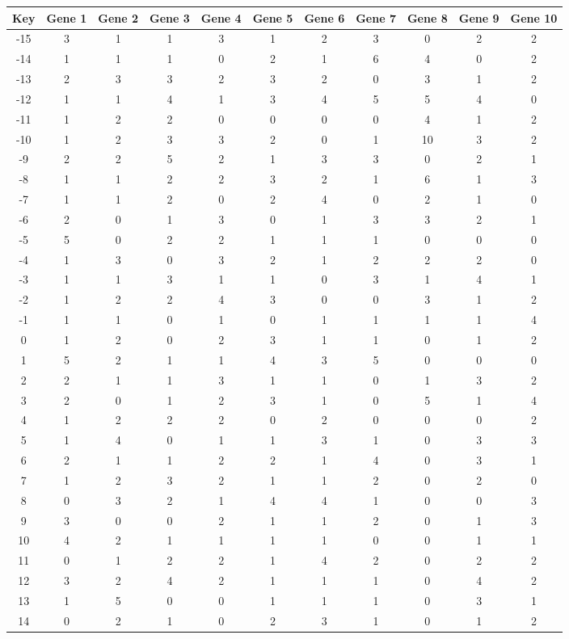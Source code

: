 \begin{tabular}{|c|c|c|c|c|c|c|c|c|c|c|}
\hline
Key & Gene 1 & Gene 2 & Gene 3 & Gene 4 & Gene 5 & Gene 6 & Gene 7 & Gene 8 & Gene 9 & Gene 10 \\
\hline
-15 & 3 & 1 & 1 & 3 & 1 & 2 & 3 & 0 & 2 & 2 \\
-14 & 1 & 1 & 1 & 0 & 2 & 1 & 6 & 4 & 0 & 2 \\
-13 & 2 & 3 & 3 & 2 & 3 & 2 & 0 & 3 & 1 & 2 \\
-12 & 1 & 1 & 4 & 1 & 3 & 4 & 5 & 5 & 4 & 0 \\
-11 & 1 & 2 & 2 & 0 & 0 & 0 & 0 & 4 & 1 & 2 \\
-10 & 1 & 2 & 3 & 3 & 2 & 0 & 1 & 10 & 3 & 2 \\
-9 & 2 & 2 & 5 & 2 & 1 & 3 & 3 & 0 & 2 & 1 \\
-8 & 1 & 1 & 2 & 2 & 3 & 2 & 1 & 6 & 1 & 3 \\
-7 & 1 & 1 & 2 & 0 & 2 & 4 & 0 & 2 & 1 & 0 \\
-6 & 2 & 0 & 1 & 3 & 0 & 1 & 3 & 3 & 2 & 1 \\
-5 & 5 & 0 & 2 & 2 & 1 & 1 & 1 & 0 & 0 & 0 \\
-4 & 1 & 3 & 0 & 3 & 2 & 1 & 2 & 2 & 2 & 0 \\
-3 & 1 & 1 & 3 & 1 & 1 & 0 & 3 & 1 & 4 & 1 \\
-2 & 1 & 2 & 2 & 4 & 3 & 0 & 0 & 3 & 1 & 2 \\
-1 & 1 & 1 & 0 & 1 & 0 & 1 & 1 & 1 & 1 & 4 \\
0 & 1 & 2 & 0 & 2 & 3 & 1 & 1 & 0 & 1 & 2 \\
1 & 5 & 2 & 1 & 1 & 4 & 3 & 5 & 0 & 0 & 0 \\
2 & 2 & 1 & 1 & 3 & 1 & 1 & 0 & 1 & 3 & 2 \\
3 & 2 & 0 & 1 & 2 & 3 & 1 & 0 & 5 & 1 & 4 \\
4 & 1 & 2 & 2 & 2 & 0 & 2 & 0 & 0 & 0 & 2 \\
5 & 1 & 4 & 0 & 1 & 1 & 3 & 1 & 0 & 3 & 3 \\
6 & 2 & 1 & 1 & 2 & 2 & 1 & 4 & 0 & 3 & 1 \\
7 & 1 & 2 & 3 & 2 & 1 & 1 & 2 & 0 & 2 & 0 \\
8 & 0 & 3 & 2 & 1 & 4 & 4 & 1 & 0 & 0 & 3 \\
9 & 3 & 0 & 0 & 2 & 1 & 1 & 2 & 0 & 1 & 3 \\
10 & 4 & 2 & 1 & 1 & 1 & 1 & 0 & 0 & 1 & 1 \\
11 & 0 & 1 & 2 & 2 & 1 & 4 & 2 & 0 & 2 & 2 \\
12 & 3 & 2 & 4 & 2 & 1 & 1 & 1 & 0 & 4 & 2 \\
13 & 1 & 5 & 0 & 0 & 1 & 1 & 1 & 0 & 3 & 1 \\
14 & 0 & 2 & 1 & 0 & 2 & 3 & 1 & 0 & 1 & 2 \\
\hline
\end{tabular}